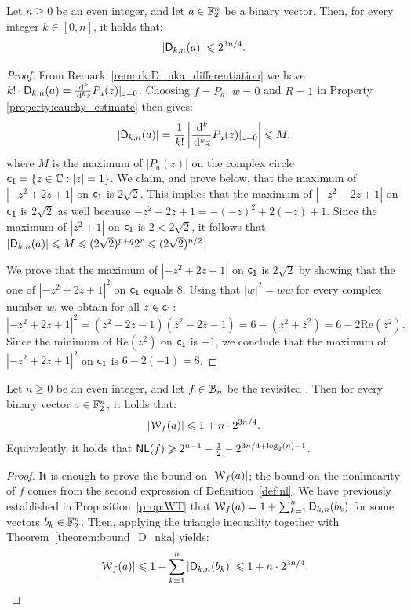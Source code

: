 \documentclass{llncs}
\begin{document}
\begin{theorem}\label{theorem:bound_D_nka}
    Let $n\geq 0$ be an even integer, and let $a\in\F_2^n$ be a binary vector. Then, for every integer $k\in[0,n]$, it holds that:
    \[
        |\Dnka nka|\leq 2^{3n/4}.
    \]
\end{theorem}

\begin{proof}
    From Remark~\ref{remark:D_nka_differentiation} we have $k!\cdot\Dnka nka=\frac{\dd^k}{\dd^k z}P_a(z)\vert_{z=0}$. Choosing $f=P_a$, $w=0$ and $R=1$ in Property \ref{property:cauchy_estimate} then gives:
    \[
        |\Dnka nka|=\frac{1}{k!}\left|\frac{\dd^k}{\dd^k z}P_a(z)\vert_{z=0}\right|\leq M,
    \]
    where $M$ is the maximum of $|P_a(z)|$ on the complex circle $\dis=\{ z \in \C: |z|=1  \}$.
    We claim, and prove below, that the maximum of $\left|-z^2+2z+1\right|$ on $\dis$ is $2\sqrt 2$. 
    This implies that the maximum of $\left|-z^2-2z+1\right|$ on $\dis$ is $2\sqrt 2$ as well because $-z^2-2z+1=-(-z)^2+2(-z)+1$. 
    Since the maximum of $\left|z^2+1\right|$ on $\dis$ is $2<2\sqrt 2$, it follows that $|\Dnka nka|\leq M\leq (2\sqrt 2)^{p+q}2^r\leq (2\sqrt 2)^{n/2}$.

	We prove that the maximum of $|-z^2+2z+1|$ on $\dis$ is $2\sqrt 2$ by showing that the one of $|-z^2+2z+1|^2$ on $\dis$ equals $8$.
    Using that $|w|^2=w\overline w$ for every complex number $w$, we obtain for all $z\in \dis$:
    \[
        \left|-z^2+2z+1\right|^2=\left(z^2-2z-1\right)\left(\overline z^2-2\overline z-1\right)=6-\left(z^2+\overline z^2\right)=6-2\mathrm{Re}\left(z^2\right).
    \]
    Since the minimum of $\mathrm{Re}\left(z^2\right)$ on $\dis$ is $-1$, we conclude that the maximum of $|-z^2+2z+1|^2$ on $\dis$ is $6-2(-1)=8$.
\end{proof}

\begin{Corollary}\label{cor:bound_walsh_cauchy}
    Let $n\geq 0$ be an even integer, and let $f\in\BN$ be the revisited \hwbf{}. Then for every binary vector $a\in\F_2^n$, it holds that:
    \[
        |\wt f(a)|\leq 1+n\cdot 2^{3n/4}.
    \]
    Equivalently, it holds that $\NL(f)\geq 2^{n-1} - \frac{1}{2} -2^{3n/4 + \log_2(n) -1}$.
\end{Corollary}

\begin{proof}
    It is enough to prove the bound on $|\wt f(a)|$; the bound on the nonlinearity of $f$ comes from the second expression of Definition~\ref{def:nl}. We have previously established in Proposition~\ref{prop:WT} that $\wt{f}(a)=1+\sum_{k=1}^n\Dnka{n}{k}{b_k}$ for some vectors $b_k\in\F_2^n$. Then, applying the triangle inequality together with Theorem~\ref{theorem:bound_D_nka} yields:
    \[
        |\wt{f}(a)|\leq 1+\sum_{k=1}^n\left|\Dnka{n}{k}{b_k}\right|\leq 1+ n\cdot 2^{3n/4}.\qedhere
    \]
\end{proof}
\end{document}
